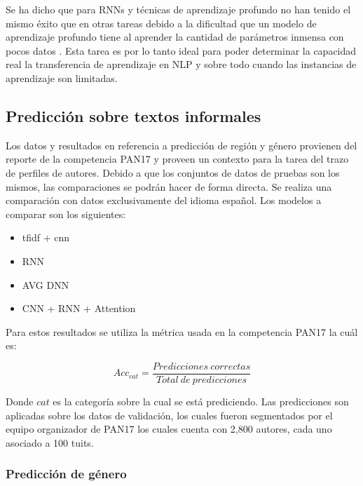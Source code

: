 Se ha dicho que para RNNs y técnicas de aprendizaje profundo no han tenido el mismo éxito que en otras tareas debido a la dificultad que un modelo de aprendizaje profundo tiene al aprender la cantidad de parámetros inmensa con pocos datos \parencite{zampieri2017, malmasi2016discriminating}. Esta tarea es por lo tanto ideal para poder determinar la capacidad real la transferencia de aprendizaje en NLP y sobre todo cuando las instancias de aprendizaje son limitadas.

\subsection{Predicción sobre textos informales}

Los datos y resultados en referencia a predicción de región y género provienen del reporte de la competencia PAN17 \parencite{rangel2017overview} y proveen un contexto para la tarea del trazo de perfiles de autores. Debido a que los conjuntos de datos de pruebas son los mismos, las comparaciones se podrán hacer de forma directa. Se realiza una comparación con datos exclusivamente del idioma español. Los modelos a comparar son los siguientes:

\begin{itemize}
\item \gls{tfidf} + \gls{cnn} \parencite{schaetti2017author}
\item RNN \parencite{kodiyan2017author}
\item AVG DNN \parencite{franco2017author}
\item CNN + RNN + Attention \parencite{miura2017author}
\end{itemize}

Para estos resultados se utiliza la métrica usada en la competencia PAN17 la cuál es:


$$ Acc_{cat} = \frac{Predicciones\: correctas}{Total\: de\: predicciones} $$

Donde $cat$ es la categoría sobre la cual se está prediciendo. Las predicciones son aplicadas sobre los datos de validación, los cuales fueron segmentados por el equipo organizador de PAN17 los cuales cuenta con 2,800 autores, cada uno asociado a 100 tuits.

\subsubsection{Predicción de género}

